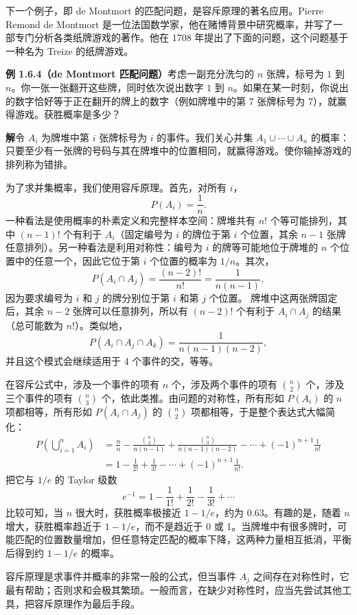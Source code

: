 \documentclass[UTF8,12pt,a4paper,fontset=fandol]{ctexart}
\begin{document}
下一个例子，即 de Montmort 的匹配问题，是容斥原理的著名应用。Pierre Remond de Montmort 是一位法国数学家，他在赌博背景中研究概率，并写了一部专门分析各类纸牌游戏的著作。他在 1708 年提出了下面的问题，这个问题基于一种名为 Treize 的纸牌游戏。

\noindent\textbf{例 1.6.4（de Montmort 匹配问题）}\quad 考虑一副充分洗匀的 $n$ 张牌，标号为 $1$ 到 $n$。你一张一张翻开这些牌，同时依次说出数字 $1$ 到 $n$。如果在某一时刻，你说出的数字恰好等于正在翻开的牌上的数字（例如牌堆中的第 7 张牌标号为 7），就赢得游戏。获胜概率是多少？

\noindent\textbf{解}\quad 令 $A_i$ 为牌堆中第 $i$ 张牌标号为 $i$ 的事件。我们关心并集 $A_1\cup\cdots\cup A_n$ 的概率：只要至少有一张牌的号码与其在牌堆中的位置相同，就赢得游戏。使你输掉游戏的排列称为错排。

为了求并集概率，我们使用容斥原理。首先，对所有 $i$，
\[
  P(A_i)=\frac1n.
\]
一种看法是使用概率的朴素定义和完整样本空间：牌堆共有 $n!$ 个等可能排列，其中 $(n-1)!$ 个有利于 $A_i$（固定编号为 $i$ 的牌位于第 $i$ 个位置，其余 $n-1$ 张牌任意排列）。另一种看法是利用对称性：编号为 $i$ 的牌等可能地位于牌堆的 $n$ 个位置中的任意一个，因此它位于第 $i$ 个位置的概率为 $1/n$。其次，
\[
  P(A_i\cap A_j)=\frac{(n-2)!}{n!}=\frac{1}{n(n-1)},
\]
因为要求编号为 $i$ 和 $j$ 的牌分别位于第 $i$ 和第 $j$ 个位置。
牌堆中这两张牌固定后，其余 $n-2$ 张牌可以任意排列，所以有 $(n-2)!$ 个有利于 $A_i\cap A_j$ 的结果（总可能数为 $n!$）。类似地，
\[
  P(A_i\cap A_j\cap A_k)=\frac{1}{n(n-1)(n-2)},
\]
并且这个模式会继续适用于 4 个事件的交，等等。

在容斥公式中，涉及一个事件的项有 $n$ 个，涉及两个事件的项有 $\binom n2$ 个，涉及三个事件的项有 $\binom n3$ 个，依此类推。由问题的对称性，所有形如 $P(A_i)$ 的 $n$ 项都相等，所有形如 $P(A_i\cap A_j)$ 的 $\binom n2$ 项都相等，于是整个表达式大幅简化：
\[
\begin{aligned}
  P\left(\bigcup_{i=1}^{n}A_i\right)
  &=\frac nn-\frac{\binom n2}{n(n-1)}
    +\frac{\binom n3}{n(n-1)(n-2)}
    -\cdots+(-1)^{n+1}\frac1{n!}\\
  &=1-\frac1{2!}+\frac1{3!}-\cdots+(-1)^{n+1}\frac1{n!}.
\end{aligned}
\]
把它与 $1/e$ 的 Taylor 级数
\[
  e^{-1}=1-\frac1{1!}+\frac1{2!}-\frac1{3!}+\cdots
\]
比较可知，当 $n$ 很大时，获胜概率极接近 $1-1/e$，约为 $0.63$。有趣的是，随着 $n$ 增大，获胜概率趋近于 $1-1/e$，而不是趋近于 0 或 1。当牌堆中有很多牌时，可能匹配的位置数量增加，但任意特定匹配的概率下降，这两种力量相互抵消，平衡后得到约 $1-1/e$ 的概率。

容斥原理是求事件并概率的非常一般的公式，但当事件 $A_j$ 之间存在对称性时，它最有帮助；否则求和会极其繁琐。一般而言，在缺少对称性时，应当先尝试其他工具，把容斥原理作为最后手段。
\end{document}
